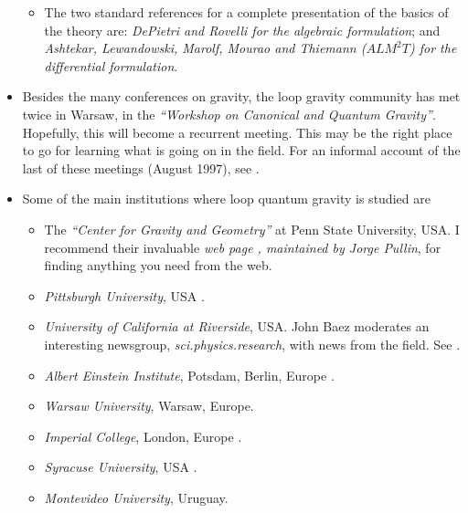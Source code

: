 \documentclass[12pt]{article}
\begin{document}
\begin{itemize}
\begin{itemize}
\item The two standard references for a complete presentation of 
the basics of the theory are: {\em DePietri and Rovelli 
\cite{DePietriRovelli} for the algebraic formulation}; and 
{\em Ashtekar, Lewandowski, Marolf, Mourao and Thiemann ($ALM^2T$) 
\cite{AshtekarEtAl95} for the differential formulation}. 

\end{itemize}

\item Besides the many conferences on gravity, the loop gravity 
community has met twice in Warsaw, in the {\em ``Workshop on Canonical 
and Quantum Gravity''}.  Hopefully, this will become a recurrent  
meeting.  This may be the right place to go for learning what is 
going on in the field.  For an informal account of the last of 
these meetings (August 1997), see \cite{RovelliMoG}.

\item Some of the main institutions where loop quantum gravity is 
studied are

\begin{itemize}

\item The {\em ``Center for Gravity and Geometry''} at Penn State 
University, USA. I recommend their invaluable {\em web page 
\cite{PennState}, maintained by Jorge Pullin}, for finding 
anything you need from the web.

\item  \emph{Pittsburgh University}, USA \cite{Pittsburgh}.

\item \emph{University of California at Riverside}, USA. John Baez 
moderates an interesting newsgroup, \emph{sci.physics.research}, 
with news from the field.  See \cite{John}.

\item \emph{Albert Einstein Institute}, Potsdam, Berlin, Europe 
\cite{Potsdam}.

\item \emph{Warsaw University}, Warsaw, Europe.

\item \emph{Imperial College}, London, Europe \cite{Imperial}.

\item \emph{Syracuse University}, USA \cite{Syracuse}.

\item \emph{Montevideo University}, Uruguay. 

\end{itemize}

\end{itemize}
\end{document}
